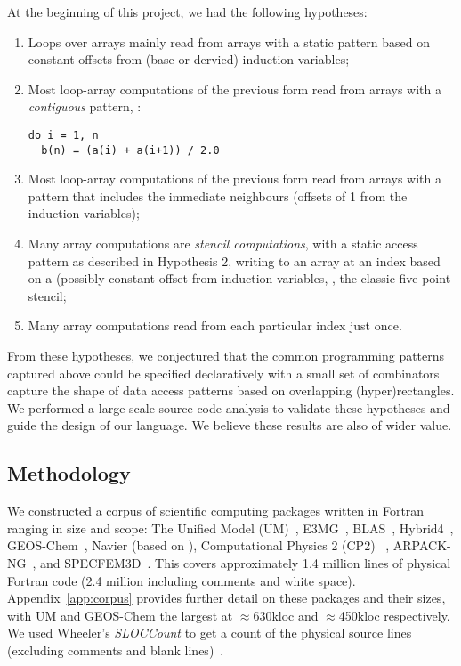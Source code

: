 At the beginning of this project, we had the following hypotheses:
\begin{enumerate}
\item Loops over arrays mainly read from arrays with a static pattern
based on constant offsets from (base or dervied) induction variables;

\item Most loop-array computations of the previous form read
from arrays with a \emph{contiguous} pattern, \eg{}:
%
\begin{verbatim}
do i = 1, n
  b(n) = (a(i) + a(i+1)) / 2.0
\end{verbatim}
%
\item Most loop-array computations of the previous form read
from arrays with a pattern that includes the immediate
neighbours (offsets of 1 from the induction variables);

\item Many array computations are \emph{stencil computations},
with a static access pattern as described in Hypothesis 2, writing
to an array at an index based on a (possibly constant offset from induction
variables, \eg{}, the classic five-point stencil;

\item Many array computations read from each particular index just once.
\end{enumerate}
%
From these hypotheses, we conjectured that the common programming
patterns captured above could be specified declaratively with a small
set of combinators capture the shape of data access patterns based on
overlapping (hyper)rectangles. We performed a large scale source-code
analysis to validate these hypotheses and guide the design of our
language. We believe these results are also of wider value.

\subsection{Methodology}
%
\noindent
We constructed a corpus of \numPackages{} scientific computing
packages written in Fortran ranging in size and scope: The Unified
Model (UM)~\cite{um}, E3MG~\cite{RePEc:aen:journl:2006se-a12},
BLAS~\cite{blas}, Hybrid4~\cite{GBC:GBC635},
GEOS-Chem~\cite{geos-chem}, Navier (based on
\cite{griebel1997numerical}), Computational Physics 2 (CP2)
~\cite{nicholas2006computational}, ARPACK-NG~\cite{arpackng}, and
SPECFEM3D~\cite{specfem3d}.  This covers
approximately 1.4 million lines of physical Fortran code (2.4 million
including comments and white space).  Appendix~\ref{app:corpus}
provides further detail on these packages and their sizes, with UM and
GEOS-Chem the largest at $\approx$630kloc and $\approx$450kloc respectively. We used
Wheeler's \emph{SLOCCount} to get a count of the physical source lines
(excluding comments and blank lines)~\cite{wheeler2001sloccount}.

